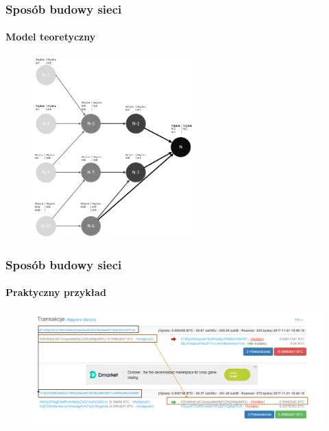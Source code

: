 \documentclass[]{beamer}
\newcommand{\frameheight}{7cm}
\begin{document}
\begin{frame}
 \frametitle{Sposób budowy sieci}
 \framesubtitle{Model teoretyczny}
 \begin{figure}
	\centering
 	\includegraphics[height=\frameheight]{pictures/visio/siec.png}
 \end{figure}
\end{frame}

\begin{frame}
 \frametitle{Sposób budowy sieci}
 \framesubtitle{Praktyczny przykład}
  \begin{figure}
 		\includegraphics[width=1\linewidth]{pictures/transakcje.png}
	\end{figure}
\end{frame}
\end{document}
